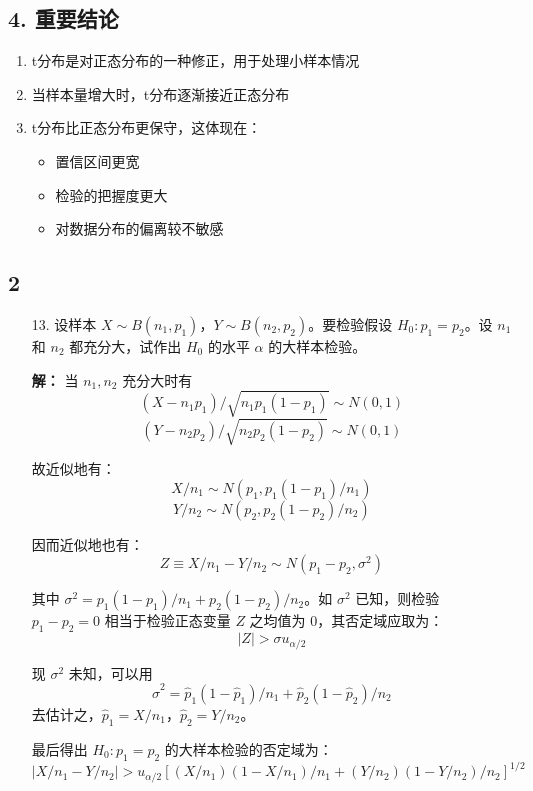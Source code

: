 \documentclass[UTF8]{report}
\theoremstyle{MyLineTheoremStyle} %
\theoremstyle{MyBlockTheoremStyle} %
\theoremstyle{MySubsubsectionStyle} %
\begin{document}
\subsection*{4. 重要结论}

\begin{enumerate}
\item t分布是对正态分布的一种修正，用于处理小样本情况
\item 当样本量增大时，t分布逐渐接近正态分布
\item t分布比正态分布更保守，这体现在：
   \begin{itemize}
   \item 置信区间更宽
   \item 检验的把握度更大
   \item 对数据分布的偏离较不敏感
   \end{itemize}
\end{enumerate}






\subsection{2}

\begin{enumerate}
    \item[13.] 设样本 $X \sim B(n_1, p_1)$，$Y \sim B(n_2, p_2)$。要检验假设 $H_0: p_1 = p_2$。设 $n_1$ 和 $n_2$ 都充分大，试作出 $H_0$ 的水平 $\alpha$ 的大样本检验。
    
    \textbf{解：}
    当 $n_1, n_2$ 充分大时有
    $$(X - n_1p_1)/\sqrt{n_1p_1(1-p_1)} \sim N(0,1)$$
    $$(Y - n_2p_2)/\sqrt{n_2p_2(1-p_2)} \sim N(0,1)$$
    
    故近似地有：
    $$X/n_1 \sim N(p_1, p_1(1-p_1)/n_1)$$
    $$Y/n_2 \sim N(p_2, p_2(1-p_2)/n_2)$$
    
    因而近似地也有：
    $$Z \equiv X/n_1 - Y/n_2 \sim N(p_1-p_2, \sigma^2)$$
    
    其中 $\sigma^2 = p_1(1-p_1)/n_1 + p_2(1-p_2)/n_2$。如 $\sigma^2$ 已知，则检验 $p_1-p_2=0$ 相当于检验正态变量 $Z$ 之均值为 $0$，其否定域应取为：
    $$|Z| > \sigma u_{\alpha/2}$$
    
    现 $\sigma^2$ 未知，可以用
    $$\hat{\sigma}^2 = \hat{p}_1(1-\hat{p}_1)/n_1 + \hat{p}_2(1-\hat{p}_2)/n_2$$
    去估计之，$\hat{p}_1 = X/n_1$，$\hat{p}_2 = Y/n_2$。
    
    最后得出 $H_0: p_1=p_2$ 的大样本检验的否定域为：
    $$|X/n_1 - Y/n_2| > u_{\alpha/2}[(X/n_1)(1-X/n_1)/n_1 + (Y/n_2)(1-Y/n_2)/n_2]^{1/2}$$
    
    \end{enumerate}
\end{document}
